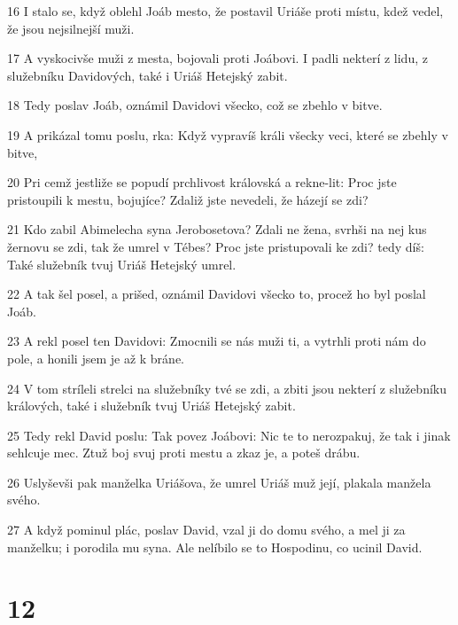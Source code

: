 \par 16 I stalo se, když oblehl Joáb mesto, že postavil Uriáše proti místu, kdež vedel, že jsou nejsilnejší muži.
\par 17 A vyskocivše muži z mesta, bojovali proti Joábovi. I padli nekterí z lidu, z služebníku Davidových, také i Uriáš Hetejský zabit.
\par 18 Tedy poslav Joáb, oznámil Davidovi všecko, což se zbehlo v bitve.
\par 19 A prikázal tomu poslu, rka: Když vypravíš králi všecky veci, které se zbehly v bitve,
\par 20 Pri cemž jestliže se popudí prchlivost královská a rekne-lit: Proc jste pristoupili k mestu, bojujíce? Zdaliž jste nevedeli, že házejí se zdi?
\par 21 Kdo zabil Abimelecha syna Jerobosetova? Zdali ne žena, svrhši na nej kus žernovu se zdi, tak že umrel v Tébes? Proc jste pristupovali ke zdi? tedy díš: Také služebník tvuj Uriáš Hetejský umrel.
\par 22 A tak šel posel, a prišed, oznámil Davidovi všecko to, procež ho byl poslal Joáb.
\par 23 A rekl posel ten Davidovi: Zmocnili se nás muži ti, a vytrhli proti nám do pole, a honili jsem je až k bráne.
\par 24 V tom stríleli strelci na služebníky tvé se zdi, a zbiti jsou nekterí z služebníku králových, také i služebník tvuj Uriáš Hetejský zabit.
\par 25 Tedy rekl David poslu: Tak povez Joábovi: Nic te to nerozpakuj, že tak i jinak sehlcuje mec. Ztuž boj svuj proti mestu a zkaz je, a poteš drábu.
\par 26 Uslyševši pak manželka Uriášova, že umrel Uriáš muž její, plakala manžela svého.
\par 27 A když pominul plác, poslav David, vzal ji do domu svého, a mel ji za manželku; i porodila mu syna. Ale nelíbilo se to Hospodinu, co ucinil David.

\chapter{12}

